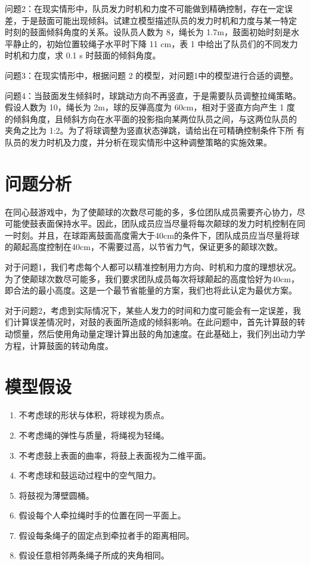 \documentclass[nocover]{cumcmart}%
\begin{document}
问题2：在现实情形中，队员发力时机和力度不可能做到精确控制，存在一定误
差，于是鼓面可能出现倾斜。试建立模型描述队员的发力时机和力度与某一特定
时刻的鼓面倾斜角度的关系。设队员人数为 8，绳长为 1.7m，鼓面初始时刻是水
平静止的，初始位置较绳子水平时下降 11 cm，表 1 中给出了队员们的不同发力
时机和力度，求 0.1 s 时鼓面的倾斜角度。

问题3：在现实情形中，根据问题 2 的模型，对问题1中的模型进行合适的调整。

问题4：当鼓面发生倾斜时，球跳动方向不再竖直，于是需要队员调整拉绳策略。
假设人数为 10，绳长为 2m，球的反弹高度为 60cm，相对于竖直方向产生 1 度
的倾斜角度，且倾斜方向在水平面的投影指向某两位队员之间，与这两位队员的
夹角之比为 1:2。为了将球调整为竖直状态弹跳，请给出在可精确控制条件下所
有队员的发力时机及力度，并分析在现实情形中这种调整策略的实施效果。

\section{问题分析}
在同心鼓游戏中，为了使颠球的次数尽可能的多，多位团队成员需要齐心协力，尽可能使鼓表面保持水平。因此，团队成员应当尽量将每次颠球的发力时机控制在同一时刻。并且，在球距离鼓面高度需大于40cm的条件下，团队成员应当尽量将球的颠起高度控制在40cm，不需要过高，以节省力气，保证更多的颠球次数。

对于问题1，我们考虑每个人都可以精准控制用力方向、时机和力度的理想状况。为了使颠球次数尽可能多，我们要求团队成员每次将球颠起的高度恰好为40cm，即合法的最小高度。这是一个最节省能量的方案，我们也将此认定为最优方案。

对于问题2，考虑到实际情况下，某些人发力的时间和力度可能会有一定误差，我们计算误差情况时，对鼓的表面所造成的倾斜影响。在此问题中，首先计算鼓的转动惯量，然后使用角动量定理计算出鼓的角加速度。在此基础上，我们列出动力学方程，计算鼓面的转动角度。



\section{模型假设}

\begin{enumerate}
    \item 不考虑球的形状与体积，将球视为质点。
    \item 不考虑绳的弹性与质量，将绳视为轻绳。
    \item 不考虑鼓上表面的曲率，将鼓上表面视为二维平面。
    \item 不考虑球和鼓运动过程中的空气阻力。
    \item 将鼓视为薄壁圆桶。
    \item 假设每个人牵拉绳时手的位置在同一平面上。
    \item 假设每条绳子的固定点到牵拉者手的距离相同。
    \item 假设任意相邻两条绳子所成的夹角相同。
\end{enumerate}
\end{document}
